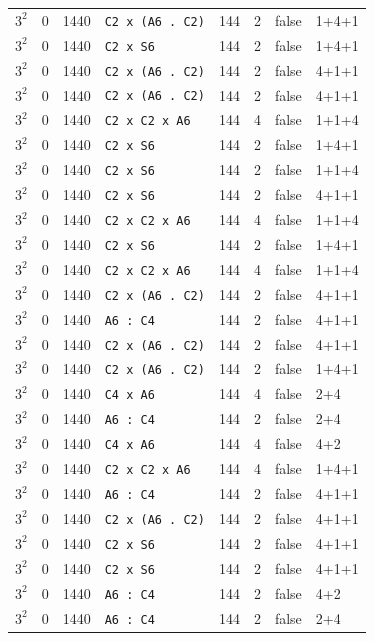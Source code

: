\begin{longtable}{llrlrrll}
$3^2$ & 0 & 1440 & \texttt{C2 x (A6 . C2)} & 144 & 2 & false & 1+4+1\\
$3^2$ & 0 & 1440 & \texttt{C2 x S6} & 144 & 2 & false & 1+4+1\\
$3^2$ & 0 & 1440 & \texttt{C2 x (A6 . C2)} & 144 & 2 & false & 4+1+1\\
$3^2$ & 0 & 1440 & \texttt{C2 x (A6 . C2)} & 144 & 2 & false & 4+1+1\\
$3^2$ & 0 & 1440 & \texttt{C2 x C2 x A6} & 144 & 4 & false & 1+1+4\\
$3^2$ & 0 & 1440 & \texttt{C2 x S6} & 144 & 2 & false & 1+4+1\\
$3^2$ & 0 & 1440 & \texttt{C2 x S6} & 144 & 2 & false & 1+1+4\\
$3^2$ & 0 & 1440 & \texttt{C2 x S6} & 144 & 2 & false & 4+1+1\\
$3^2$ & 0 & 1440 & \texttt{C2 x C2 x A6} & 144 & 4 & false & 1+1+4\\
$3^2$ & 0 & 1440 & \texttt{C2 x S6} & 144 & 2 & false & 1+4+1\\
$3^2$ & 0 & 1440 & \texttt{C2 x C2 x A6} & 144 & 4 & false & 1+1+4\\
$3^2$ & 0 & 1440 & \texttt{C2 x (A6 . C2)} & 144 & 2 & false & 4+1+1\\
$3^2$ & 0 & 1440 & \texttt{A6 : C4} & 144 & 2 & false & 4+1+1\\
$3^2$ & 0 & 1440 & \texttt{C2 x (A6 . C2)} & 144 & 2 & false & 4+1+1\\
$3^2$ & 0 & 1440 & \texttt{C2 x (A6 . C2)} & 144 & 2 & false & 1+4+1\\
$3^2$ & 0 & 1440 & \texttt{C4 x A6} & 144 & 4 & false & 2+4\\
$3^2$ & 0 & 1440 & \texttt{A6 : C4} & 144 & 2 & false & 2+4\\
$3^2$ & 0 & 1440 & \texttt{C4 x A6} & 144 & 4 & false & 4+2\\
$3^2$ & 0 & 1440 & \texttt{C2 x C2 x A6} & 144 & 4 & false & 1+4+1\\
$3^2$ & 0 & 1440 & \texttt{A6 : C4} & 144 & 2 & false & 4+1+1\\
$3^2$ & 0 & 1440 & \texttt{C2 x (A6 . C2)} & 144 & 2 & false & 4+1+1\\
$3^2$ & 0 & 1440 & \texttt{C2 x S6} & 144 & 2 & false & 4+1+1\\
$3^2$ & 0 & 1440 & \texttt{C2 x S6} & 144 & 2 & false & 4+1+1\\
$3^2$ & 0 & 1440 & \texttt{A6 : C4} & 144 & 2 & false & 4+2\\
$3^2$ & 0 & 1440 & \texttt{A6 : C4} & 144 & 2 & false & 2+4\\

\end{longtable}
